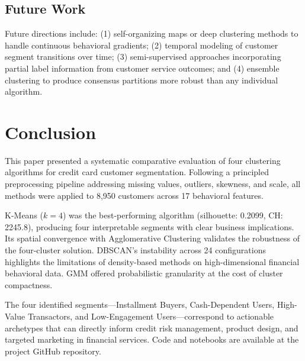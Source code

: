 \documentclass[conference]{IEEEtran}
\begin{document}
\subsection{Future Work}

Future directions include: (1) self-organizing maps or deep
clustering methods to handle continuous behavioral gradients;
(2) temporal modeling of customer segment transitions over time;
(3) semi-supervised approaches incorporating partial label information
from customer service outcomes; and (4) ensemble clustering to produce
consensus partitions more robust than any individual algorithm.

\section{Conclusion}
\label{sec:conclusion}

This paper presented a systematic comparative evaluation of four
clustering algorithms for credit card customer segmentation.
Following a principled preprocessing pipeline addressing missing
values, outliers, skewness, and scale, all methods were applied to
8,950 customers across 17 behavioral features.

K-Means ($k{=}4$) was the best-performing algorithm (silhouette:
0.2099, CH: 2245.8), producing four interpretable segments with clear
business implications. Its spatial convergence with Agglomerative
Clustering validates the robustness of the four-cluster solution.
DBSCAN's instability across 24 configurations highlights the
limitations of density-based methods on high-dimensional financial
behavioral data. GMM offered probabilistic granularity at the cost of
cluster compactness.

The four identified segments---Installment Buyers, Cash-Dependent
Users, High-Value Transactors, and Low-Engagement Users---correspond
to actionable archetypes that can directly inform credit risk
management, product design, and targeted marketing in financial
services. Code and notebooks are available at the project GitHub
repository.
\end{document}
